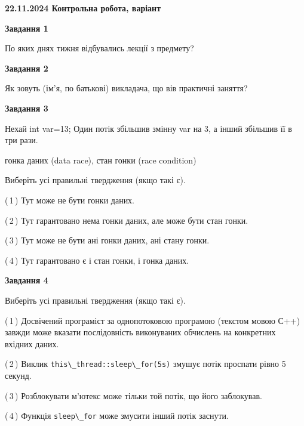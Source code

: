 \documentclass[12pt, ukrainian]{article}
\def\code#1{\Verb!#1!}
\begin{document}
\begin {large}

\textbf{22.11.2024 Контрольна робота, варіант  }\par


{

\begin{center}
\textbf{Завдання 1}
\end{center}

По яких днях тижня відбувались лекції з предмету?


\begin{center}
\textbf{Завдання 2}
\end{center}

Як зовуть (ім'я, по батькові) викладача, що вів практичні заняття?


\begin{center}
\textbf{Завдання 3}
\end{center}

Нехай int var=13; Один потік збільшив змінну var на 3, а інший збільшив її в три рази.

гонка даних (data race), стан гонки (race condition)

Виберіть усі правильні твердження (якщо такі є).\par
\vspace{2mm}
(\,1\,) Тут може не бути гонки даних.%

(\,2\,) Тут гарантовано нема гонки даних, але може бути стан гонки.%

(\,3\,) Тут може не бути ані гонки даних, ані стану гонки.%

(\,4\,) Тут гарантовано є і стан гонки, і гонка даних.%


\begin{center}
\textbf{Завдання 4}
\end{center}

Виберіть усі правильні твердження (якщо такі є).\par
\vspace{2mm}

(\,1\,) Досвічений програміст за однопотоковою програмою (текстом мовою С++) завжди може вказати послідовність виконуваних обчислень на конкретних вхідних даних.%

(\,2\,) Виклик \code{this\_thread::sleep\_for(5s)} змушує потік проспати рівно 5 секунд.%

(\,3\,) Розблокувати м’ютекс може тільки той потік, що його заблокував.%

(\,4\,) Функція \code{sleep\_for} може змусити інший потік заснути.%


}
\end{large}
\end{document}
